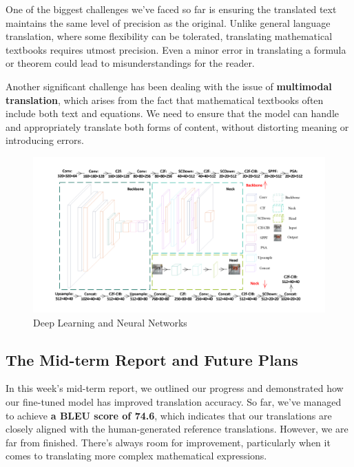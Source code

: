 \documentclass[a4paper]{article} 	%
\begin{document}
One of the biggest challenges we’ve faced so far is ensuring the translated text maintains the same level of precision as the original. Unlike general language translation, where some flexibility can be tolerated, translating mathematical textbooks requires utmost precision. Even a minor error in translating a formula or theorem could lead to misunderstandings for the reader.

Another significant challenge has been dealing with the issue of \textbf{multimodal translation}, which arises from the fact that mathematical textbooks often include both text and equations. We need to ensure that the model can handle and appropriately translate both forms of content, without distorting meaning or introducing errors.

\begin{figure}[h!]
	\centering
	\includegraphics[width=1.0\textwidth]{fig0032.png}  %
	\caption{Deep Learning and Neural Networks}
	\label{fig:0032}
\end{figure}

\subsection*{The Mid-term Report and Future Plans}

In this week’s mid-term report, we outlined our progress and demonstrated how our fine-tuned model has improved translation accuracy. So far, we’ve managed to achieve \textbf{a BLEU score of 74.6}, which indicates that our translations are closely aligned with the human-generated reference translations. However, we are far from finished. There’s always room for improvement, particularly when it comes to translating more complex mathematical expressions.
\end{document}
